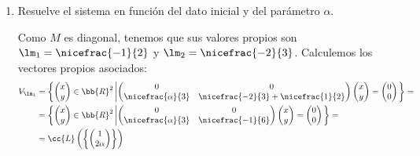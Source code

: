 \begin{ejercicio}
\begin{enumerate}
    \item Resuelve el sistema en función del dato inicial y del parámetro $\alpha$.
    
    Como $M$ es diagonal, tenemos que sus valores propios son $\lm_1 = \nicefrac{-1}{2}$ y $\lm_2 = \nicefrac{-2}{3}$.
    Calculemos los vectores propios asociados:
    \begin{align*}
        V_{\lm_1} &= \left\{
            \begin{pmatrix}
                x \\ y
            \end{pmatrix} \in \bb{R}^2 \left|
            \begin{pmatrix}
                0 & 0\\
                \nicefrac{\alpha}{3} & \nicefrac{-2}{3}+\nicefrac{1}{2}
            \end{pmatrix}\begin{pmatrix}
                x \\ y
            \end{pmatrix} = \begin{pmatrix}
                0 \\ 0
            \end{pmatrix}
            \right.
        \right\}=\\
        &= \left\{
            \begin{pmatrix}
                x \\ y
            \end{pmatrix} \in \bb{R}^2 \left|
            \begin{pmatrix}
                0 & 0\\
                \nicefrac{\alpha}{3} & \nicefrac{-1}{6}
            \end{pmatrix}\begin{pmatrix}
                x \\ y
            \end{pmatrix} = \begin{pmatrix}
                0 \\ 0
            \end{pmatrix}
            \right.
        \right\}=\\
        &= \cc{L}\left(\left\{\begin{pmatrix}
                1 \\ 2\alpha
            \end{pmatrix}\right\}\right)
        \\ \\

\end{align*}
\end{enumerate}
\end{ejercicio}
